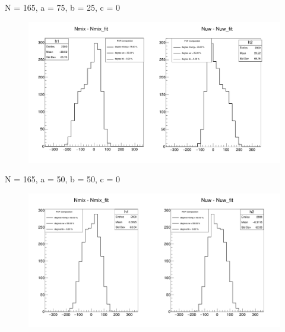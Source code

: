 \documentclass[10pt]{beamer}
\begin{document}
\begin{frame}{N = 165, a = 75, b = 25, c = 0}

\begin{figure}
\includegraphics[width = 1\textwidth]{Nequalto164/toy(75,25,0).png} 
\end{figure}
\end{frame}

\begin{frame}{N = 165, a = 50, b = 50, c = 0}
\begin{figure}
\includegraphics[width = 1\textwidth]{Nequalto164/toy(50,50,0).png}
\end{figure}
\end{frame}
\end{document}
